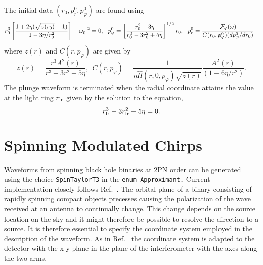 The initial data $(r_0, p_{r}^0, p_{\varphi}^0)$ are found using
\begin{equation}
r_0^3 \left [ \frac {1 + 2 \eta (\sqrt{z(r_0)} -1 )}{1- 3\eta/r_0^2} \right ]-  \omega_0^{-2} = 0,\ \ 
p^0_\varphi = \left [\frac {r_0^2 - 3 \eta}{r_0^3 - 3 r_0^2 + 5 \eta} \right ]^{1/2}r_0,\ \ 
p^0_r = \frac {{\cal F}_\varphi(\omega)}{C(r_0,p^0_\varphi) (dp^0_\varphi/dr_0)}\ \ 
\end{equation}
where $z(r)$ and $C(r,p_\varphi)$ are given by
\begin{equation}
z(r) = \frac{r^3 A^2(r)}{r^3-3r^2+5 \eta},\ \ 
C(r,p_\varphi) = \frac{1}{\eta \widehat{H} (r,0,p_\varphi)
 \sqrt{z(r)}} \frac{A^2(r)}{(1-6\eta/r^2)}.
\end{equation}
The plunge waveform is terminated when the radial coordinate attains the value
at the light ring $r_{\rm lr}$ given by the solution to the equation,
\begin{equation}
r_{\rm lr}^3 - 3 r_{\rm lr}^2 + 5 \eta = 0.
\label{eq:LightRing}
\end{equation}

\section{Spinning Modulated Chirps}
\label{sec:smirches}
Waveforms from spinning black hole binaries at 2PN order can be
generated using the choice {\tt SpinTaylorT3} in the {\tt enum
Approximant.} Current implementation closely follows Ref.~\cite{ACST94}.
The orbital plane of a binary consisting of rapidly spinning compact
objects precesses causing the polarization of the wave received at an
antenna to continually change. This change depends on the source location
on the sky and it might therefore be possible to resolve the direction
to a source. It is therefore essential to specify the coordinate system 
employed in the description of the waveform. As in Ref.~\cite{ACST94}
the coordinate system is adapted to the detector with the x-y plane
in the plane of the interferometer with the axes along the two arms.

